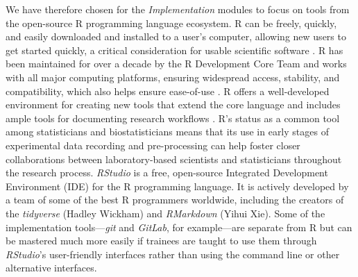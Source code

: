 \documentclass[pdftex,english,11pt,parskip=half]{scrartcl}
\begin{document}
We have therefore chosen for the \textit{Implementation} 
modules to focus on tools from the open-source R programming language ecosystem. R can be
freely, quickly, and easily downloaded and installed to a user's computer,
allowing new users to get started quickly, a critical consideration for usable
scientific software \cite{list2017ten}. R has been maintained for over a decade
by the R Development Core Team and works with all major computing platforms,
ensuring  widespread access, stability, and compatibility, which also helps ensure
ease-of-use \cite{baumer2018lessons, altschul2013anatomy}. R offers a
well-developed environment for creating new tools that extend the core language
\cite{wickham2015r, gentleman2004bioconductor} and includes ample tools for documenting research workflows
\cite{xie2015dynamic, xie2016bookdown}. R's status as a common tool among statisticians and biostatisticians means that its use in early stages of
experimental data recording and pre-processing can help foster closer
collaborations between laboratory-based scientists and statisticians throughout
the research process. \textit{RStudio} is a free, open-source Integrated Development Environment (IDE) for the R programming language. It is actively developed by a team of some of the best R programmers worldwide, including the creators of the \textit{tidyverse} (Hadley Wickham) and \textit{RMarkdown} (Yihui Xie). Some
of the implementation tools---\textit{git} and \textit{GitLab}, for example---are separate from R
but can be mastered much more easily if trainees are taught to use them through
\textit{RStudio}'s user-friendly interfaces rather than using the command line or other
alternative interfaces. 

\end{document}
